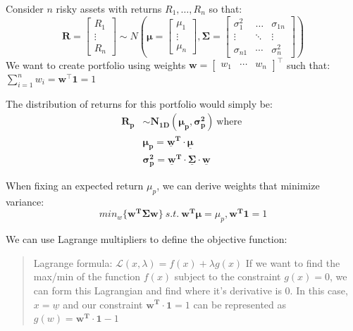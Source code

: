 \documentclass[
  oneside]{book}
\begin{document}
Consider \(n\) risky assets with returns \(R_1, \ldots, R_n\) so that:
\[
\mathbf{R}=\left[\begin{array}{c}
R_1 \\
\vdots \\
R_n
\end{array}\right] \sim N\left(\boldsymbol{\mu}=\left[\begin{array}{c}
\mu_1 \\
\vdots \\
\mu_n
\end{array}\right], \boldsymbol{\Sigma}=\left[\begin{array}{ccc}
\sigma_1^2 & \ldots & \sigma_{1 n} \\
\vdots & \ddots & \vdots \\
\sigma_{n 1} & \cdots & \sigma_n^2
\end{array}\right]\right)
\]
We want to create portfolio using weights \(\mathbf{w}=\left[\begin{array}{lll}w_1 & \cdots & w_n\end{array}\right]^{\top}\) such that: \(\sum_{i=1}^n w_i=\mathbf{w}^{\top} \mathbf{1}=1\)

The distribution of returns for this portfolio would simply be:
\[
\begin{aligned}
\mathbf{R_{p}} &\sim \mathbf{N_{1D}(\mu_{p}, \sigma_{p}^{2})} \ \text{where }\\
&\mathbf{\mu_{p} = \underline{w}^{T}\cdot \underline{\mu}}\\
&\mathbf{\sigma_{p}^{2}=\underline{w}^{T}\cdot\underline{\Sigma}\cdot\underline{w}}
\end{aligned}
\]

When fixing an expected return \(\mu_{p}\), we can derive weights that minimize variance:
\[
min_{w}\{\mathbf{w^{T}\Sigma w}\}\ s.t. \ \mathbf{w^{T}\mu} = \mu_{p}, \mathbf{w^{T}1} = 1
\]

We can use Lagrange multipliers to define the objective function:

\begin{quote}
Lagrange formula: \(\mathcal{L}(x,\lambda) = f(x)+\lambda g(x)\)
If we want to find the max/min of the function \(f(x)\) subject to the constraint \(g(x) = 0\), we can form this Lagrangian and find where it's derivative is 0. In this case, \(x=\underline{w}\) and our constraint \(\mathbf{w^{T}\cdot 1} = 1\) can be represented as \(g(w) = \mathbf{w^{T}\cdot 1} -1\)
\end{quote}
\end{document}
